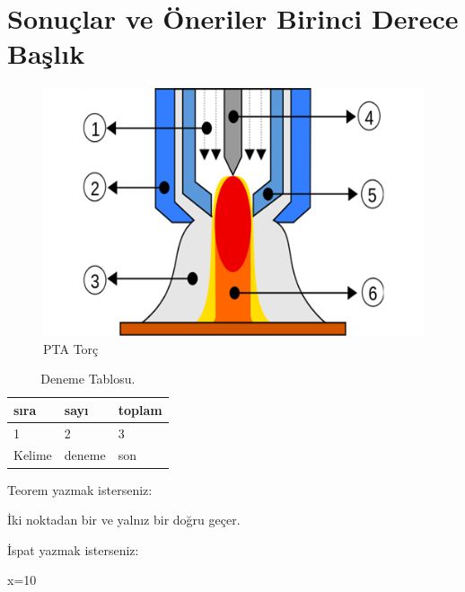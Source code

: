 \section{Sonuçlar ve Öneriler Birinci Derece Başlık}
\lipsum[1-2]
\begin{figure}[h]
\centering
\includegraphics[width=\textwidth]{gorseller/ptaTorc}
\caption{PTA Torç}\label{fig:PtaTorc1}
\end{figure}
\lipsum[1-2]
\begin{table}
\centering
\caption{Deneme Tablosu.}\label{tab:den1}
\begin{tabular}{|l|l|l|}
\hline
sıra   & sayı   & toplam \\ \hline
1      & 2      & 3      \\ \hline
Kelime & deneme & son    \\ \hline
\end{tabular}
\end{table}
Teorem yazmak isterseniz:
\begin{theorem}[Öklid]
 İki noktadan bir ve yalnız bir doğru geçer.
\end{theorem}

İspat yazmak isterseniz:
\begin{ispat}
x=10
\end{ispat}

